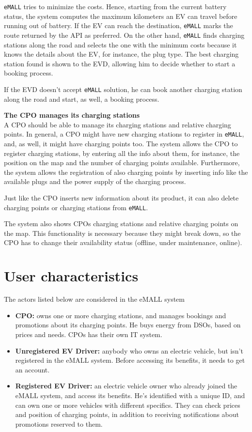 \verb|eMALL| tries to minimize the costs.
Hence, starting from the current battery status, the system computes the maximum kilometers an EV can travel before running out of battery.
If the EV can reach the destination, \verb|eMALL| marks the route returned by the API as preferred.
On the other hand, \verb|eMALL| finds charging stations along the road and selects the one with the minimum costs because it knows the details about the EV, for instance, the plug type.
The best charging station found is shown to the EVD, allowing him to decide whether to start a booking process.

If the EVD doesn't accept \verb|eMALL| solution, he can book another charging station along the road and start, as well, a booking process.

\textbf{The CPO manages its charging stations} \\
A CPO should be able to manage its charging stations and relative charging points.
In general, a CPO might have new charging stations to register in \verb|eMALL|, and, as well, it might have charging points too.
The system allows the CPO to register charging stations, by entering all the info about them, for instance, the position on the map and the number of charging points available.
Furthermore, the system allows the registration of also charging points by inserting info like the available plugs and the power supply of the charging process.

Just like the CPO inserts new information about its product, it can also delete charging points or charging stations from \verb|eMALL|\@.

The system also shows CPOs charging stations and relative charging points on the map.
This functionality is necessary because they might break down, so the CPO has to change their availability status (offline, under maintenance, online).


\section{User characteristics}
\label{sec:user_characteristics}%
The actors listed below are considered in the eMALL system
\begin{itemize}
    \item \textbf{CPO:} owns one or more charging stations, and manages bookings and promotions about its charging points.
    He buys energy from DSOs, based on prices and needs.
    CPOs has their own IT system.
    \item \textbf{Unregistered EV Driver:} anybody who owns an electric vehicle, but isn’t registered in the eMALL system.
    Before accessing its benefits, it needs to get an account.
    \item \textbf{Registered EV Driver:} an electric vehicle owner who already joined the eMALL system, and access its benefits.
    He’s identified with a unique ID, and can own one or more vehicles with different specifics.
    They can check prices and position of charging points, in addition to receiving notifications about promotions reserved to them.
\end{itemize}


